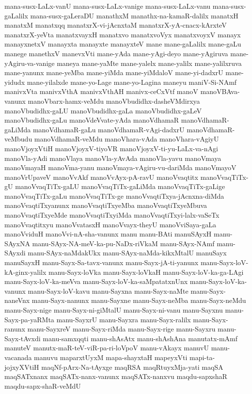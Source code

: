 {mana-susx-LaLx-vanU
mana-susx-LaLx-vanige
mana-susx-LaLx-vanu
mana-susx-gaLalilx
mana-susx-gaLeraDU
manathxM
manathx-na-kamaR-dalilx
manatxH
manatxM
manatxqq
manatxrX-vi-jAcnxtaM
manatxrX-yA-cnacx-kArxteV
manatxrX-yeVta
manatxvayxH
manatxvo
manatxvoVyx
manatxvoyxV
manayx
manayxnetxV
manayxta
manayxte
manayxteV
mane
mane-gaLalilx
mane-gaLu
manege
manethxV
manevxVti
mane-yAda
mane-yAgi-deyo
mane-yAgiruva
mane-yAgiru-va-vanige
maneya
mane-yaMte
mane-yalelx
mane-yalilx
mane-yalilxruva
mane-yanunx
mane-yeMba
mane-yiMda
mane-yiMdaloV
mane-yi-dadxrU
mane-yidudx
mane-yilalxde
mane-yo-Lage
mane-yo-Lagina
maneyu
maniV-Si-NAmf
manivxVta
manivxVthA
manivxVthAH
manivx-ceCxVtf
manoV
manoVBAva-vanunx
manoVbarx-hamx-veMdu
manoVbudidhx-dasheVMdirxya
manoVbudidhx-gaLU
manoVbudidhx-gaLa
manoVbudidhx-gaLeV
manoVbudidhx-gaLu
manoVdeVvate-yAda
manoVdhamaR
manoVdhamaR-gaLiMda
manoVdhamaR-gaLu
manoVdhamaR-vAgi-dadxrU
manoVdhamaR-veMbudu
manoVdhamaR-veMdu
manoVhara-vAda
manoVhara-vAgiyU
manoVjoyxVtiH
manoVjoyxV-tiyoVR
manoVjoyxV-ti-yu-LaLx-va-nAgi
manoVla-yAdi
manoVlaya
manoVla-yAvAda
manoVla-yavu
manoVmaya
manoVmayaH
manoVma-yanu
manoVmaya-vAgiru-vu-dariMda
manoVmayoV
manoVrUpaveV
manoVvAkf
manoVvAyx-pA-ravU
manoVvaqtitx
manoVvaqTiTx-gU
manoVvaqTiTx-gaLU
manoVvaqTiTx-gaLiMda
manoVvaqTiTx-gaLige
manoVvaqTiTx-gaLu
manoVvaqTiTx-ge
manoVvaqtiTxya-jAcnxna-diMda
manoVvaqtiTxyanunx
manoVvaqtiTxyeMba
manoVvaqtiTxyeMbuva
manoVvaqtiTxyeMde
manoVvaqtiTxyiMda
manoVvaqtiTxyi-lalx-vaSeTx
manoVvaqtitxyu
manoVvatasxH
manoVvayx-theyU
manoVviSaya-gaLa
manoVviduH
manoVvi-nA-sha-vanunx
manu
manu-BAti
manuSAyxH
manu-SAyxNA
manu-SAyx-NA-meV-ka-pu-NaDx-riVkaM
manu-SAyx-NAmf
manu-SAyxdi
manu-SAyx-naMdakUkx
manu-SAyx-naMda-kikxMtalU
manuSayx
manuSayxH
manu-Sayx-Sa-tavx-vanunx
manu-Sayx-jA-ti-yanunx
manu-Sayx-loV-kA-ginx-yalilx
manu-Sayx-loVka
manu-Sayx-loVkaH
manu-Sayx-loV-ka-ga-LAgi
manu-Sayx-loV-ka-meVva
manu-Sayx-loV-ka-saMpatatxnUnx
manu-Sayx-loV-ka-vanunx
manu-Sayx-loV-kavu
manu-Sayxna
manu-Sayx-naMte
manu-Sayx-naneVnx
manu-Sayx-nanunx
manu-Sayxne
manu-Sayx-neMba
manu-Sayx-neMdu
manu-Sayx-nige
manu-Sayx-ni-giMtalU
manu-Sayx-ni-vanu
manu-Sayxnu
manu-Sayx-pa-yaRMta
manu-SayxrU
manu-Sayxra
manu-Sayx-ralilx
manu-Sayx-ranunx
manu-SayxreV
manu-Sayx-riMda
manu-Sayx-rige
manu-Sayxru
manu-Sayx-tAvxdi
manu-samxqqti
manu-shAsAtx
manu-shAshAna
manutatx-mAmf
manuteV
manutx-maR-teV-viR-pa-ri-loVpoV
manu-vAkayx
manuvU
manu-vacanada
manuvu
maparxtUyxM
mapa-shayxtaH
mapeyxVti
mapi-ta-jojxyXVtiH
maqNf-pArx-Na-tAyxge
maqRSA
maqRtuyxMja-yati
maqSA
maqSATxnanx
maqSATx-nanx-vanunx
maqSATx-nanxvu
maqdu-sapxshaR
maqdu-sapx-shaR-veMdU
}
